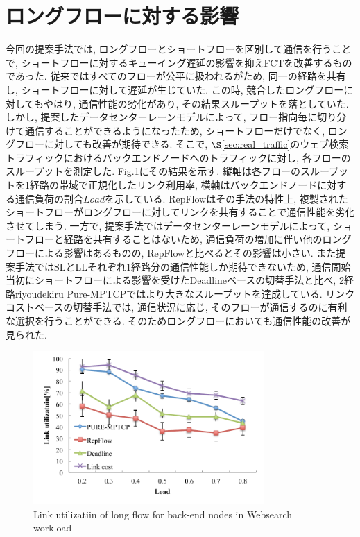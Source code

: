 \section{ロングフローに対する影響}
今回の提案手法では, ロングフローとショートフローを区別して通信を行うことで,
ショートフローに対するキューイング遅延の影響を抑えFCTを改善するものであった. 
従来ではすべてのフローが公平に扱われるがため, 同一の経路を共有し, ショートフローに対して遅延が生じていた. 
この時, 競合したロングフローに対してもやはり, 通信性能の劣化があり, その結果スループットを落としていた\cite{mptcp_ana2}. 
しかし, 提案したデータセンターレーンモデルによって, フロー指向毎に切り分けて通信することができるようになったため, ショートフローだけでなく,
ロングフローに対しても改善が期待できる. 
そこで, $\S$\ref{sec:real_traffic}のウェブ検索トラフィックにおけるバックエンドノードへのトラフィックに対し,
各フローのスループットを測定した. 
Fig.\ref{fig:websearch_longflow}にその結果を示す. 
縦軸は各フローのスループットを1経路の帯域で正規化したリンク利用率, 横軸はバックエンドノードに対する通信負荷の割合$Load$を示している. 
RepFlowはその手法の特性上, 複製されたショートフローがロングフローに対してリンクを共有することで通信性能を劣化させてしまう. 
一方で, 提案手法ではデータセンターレーンモデルによって, ショートフローと経路を共有することはないため,
通信負荷の増加に伴い他のロングフローによる影響はあるものの, RepFlowと比べるとその影響は小さい. 
また提案手法ではSLとLLそれぞれ1経路分の通信性能しか期待できないため,
通信開始当初にショートフローによる影響を受けたDeadlineベースの切替手法と比べ, 2経路riyoudekiru 
Pure-MPTCPではより大きなスループットを達成している. 
リンクコストベースの切替手法では, 通信状況に応じ, そのフローが通信するのに有利な選択を行うことができる.
そのためロングフローにおいても通信性能の改善が見られた. 

\begin{figure}[t]
    \begin{center}
    \includegraphics[autoebb, width=250pt]{./img/link_utilization.pdf}
    \caption{Link utilizatiin of long flow for back-end nodes in Websearch
    workload}
    \label{fig:websearch_longflow}
    \end{center}
\end{figure}

